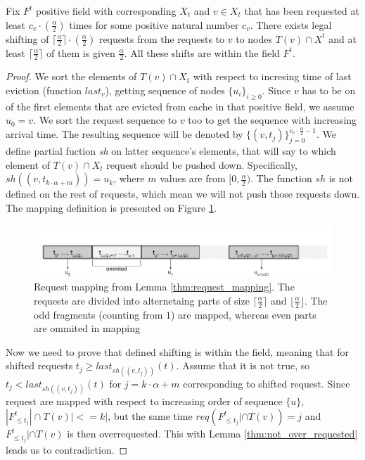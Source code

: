 \begin{lemma}
Fix $F^t$ positive field with corresponding $X_t$ and $v \in X_t$ that has 
been requested at least $c_v \cdot (\frac{\alpha}{2})$ times for some positive 
natural number $c_v$. There exists legal shifting of $\lceil \frac{\alpha}{2} 
\rceil \cdot (\frac{\alpha}{2})$ requests from the requests to $v$ to nodes 
$T(v) \cap X^t$ and at least $\lceil \frac{\alpha}{2} \rceil$ of them is given 
$\frac{\alpha}{2}$. All these shifts are within the field $F^t$.
\label{thm:request_mapping}
\end{lemma}
\begin{proof}
We sort the elements of $T(v) \cap X_t$ with respect to incresing time of last 
eviction (function $last_v$), getting sequence of nodes $\{u_i\}_{i \geq 
0}$. Since $v$ has to be on of the first elements that are evicted from cache 
in that positive field, we assume $u_0 = v$. We sort the request sequence to 
$v$ too to get the sequence with increasing arrival time. The resulting 
sequence will be denoted by $\{(v, t_j)\}_{j=0}^{c_v \cdot \frac{\alpha}{2} - 
1}$. We define partial fuction \textit{sh} on latter sequence's 
elements, that will say to which element of $T(v) \cap X_t$ request should be 
pushed down. Specifically, $sh((v, t_{k \cdot \alpha + m})) = u_k$, where $m$ 
values are from $[0, \frac{\alpha}{2})$. The function $sh$ is not defined on 
the rest of requests, which mean we will not push those requests down. The 
mapping definition is presented on Figure \ref{fig:req_map}.
\begin{figure}
 \begin{center}
  \includegraphics[width=1.1\textwidth]{request_mapping.png}
 \end{center}
 \caption{Request mapping from Lemma \ref{thm:request_mapping}. The requests 
are divided into alternetaing parts of size $\lceil \frac{\alpha}{2} \rceil$ 
and $\lfloor \frac{\alpha}{2} \rfloor$. The odd fragments (counting from $1$) 
are mapped, whereas even parts are ommited in mapping}
 \label{fig:req_map}
\end{figure}

Now we need to prove that defined shifting is within the field, meaning that 
for shifted requests $t_j \geq last_{sh((v, t_j))}(t)$. Assume that it is not 
true, so $t_j < last_{sh((v, t_j))}(t)$ for $j = k \cdot \alpha + m$ 
corresponding to shifted request. Since request are mapped with respect to 
increasing order of sequence $\{u\}$, $|F^t_{\leq t_j}| \cap T(v)| <= k|$, but 
the same time $req(F^t_{\leq t_j}| \cap T(v)) = j$ and $F^t_{\leq t_j}| \cap 
T(v)$ is then overrequested. This with Lemma \ref{thm:not_over_requested} leads 
us to contradiction.
\end{proof}
